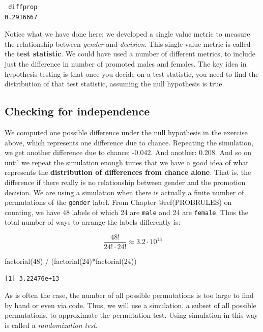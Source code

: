 \documentclass[
  letterpaper,
  DIV=11,
  numbers=noendperiod]{scrreprt}
\newenvironment{Shaded}{\begin{snugshade}}{\end{snugshade}}
\newcommand{\DecValTok}[1]{\textcolor[rgb]{0.68,0.00,0.00}{#1}}
\newcommand{\FunctionTok}[1]{\textcolor[rgb]{0.28,0.35,0.67}{#1}}
\newcommand{\NormalTok}[1]{\textcolor[rgb]{0.00,0.23,0.31}{#1}}
\newcommand{\SpecialCharTok}[1]{\textcolor[rgb]{0.37,0.37,0.37}{#1}}
\begin{document}
\begin{verbatim}
 diffprop 
0.2916667 
\end{verbatim}

Notice what we have done here; we developed a single value metric to
measure the relationship between \emph{gender} and \emph{decision}. This
single value metric is called the \textbf{test statistic}. We could have
used a number of different metrics, to include just the difference in
number of promoted males and females. The key idea in hypothesis testing
is that once you decide on a test statistic, you need to find the
distribution of that test statistic, assuming the null hypothesis is
true.

\subsection{Checking for independence}\label{checking-for-independence}

We computed one possible difference under the null hypothesis in the
exercise above, which represents one difference due to chance. Repeating
the simulation, we get another difference due to chance: -0.042. And
another: 0.208. And so on until we repeat the simulation enough times
that we have a good idea of what represents the \textbf{distribution of
differences from chance alone}. That is, the difference if there really
is no relationship between gender and the promotion decision. We are
using a simulation when there is actually a finite number of
permutations of the \texttt{gender} label. From Chapter @ref(PROBRULES)
on counting, we have 48 labels of which 24 are \texttt{male} and 24 are
\texttt{female}. Thus the total number of ways to arrange the labels
differently is:

\[
\frac{48!}{24!\cdot24!} \approx 3.2 \cdot 10^{13}
\]

\begin{Shaded}
\begin{Highlighting}[]
\FunctionTok{factorial}\NormalTok{(}\DecValTok{48}\NormalTok{) }\SpecialCharTok{/}\NormalTok{ (}\FunctionTok{factorial}\NormalTok{(}\DecValTok{24}\NormalTok{)}\SpecialCharTok{*}\FunctionTok{factorial}\NormalTok{(}\DecValTok{24}\NormalTok{))}
\end{Highlighting}
\end{Shaded}

\begin{verbatim}
[1] 3.22476e+13
\end{verbatim}

As is often the case, the number of all possible permutations is too
large to find by hand or even via code. Thus, we will use a simulation,
a subset of all possible permutations, to approximate the permutation
test. Using simulation in this way is called a \emph{randomization
test}.
\end{document}
